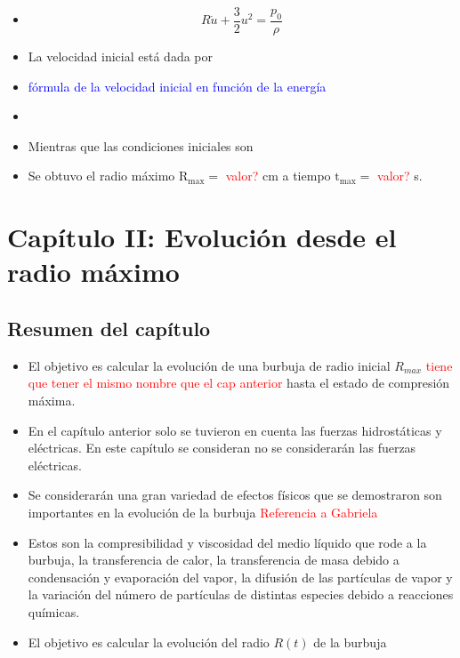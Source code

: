 \documentclass[aps,prb,twocolumn,superscriptaddress,floatfix,longbibliography,10pt]{revtex4-2}
\newif\ifptitle
\newif\ifpnumber
\newcounter{para}
\newcommand\ptitle[1]{\par\refstepcounter{para}
{\ifpnumber{\noindent\textcolor{lightgray}{\textbf{\thepara}}\indent}\fi}
{\ifptitle{\textbf{[{#1}]}}\fi}}
\begin{document}
\begin{itemize}
  \item 
  \begin{equation}
    R \dot{u} + \frac{3}{2}u^2 = \frac{p_0}{\rho}
  \end{equation}


  \item La velocidad inicial está dada por 
  \item \textcolor{blue}{fórmula de la velocidad inicial en función de la energía}
  \item 
  \item Mientras que las condiciones iniciales son 
  \item Se obtuvo el radio máximo $\mathrm{R_{max}} = $ \textcolor{red}{valor?} cm a tiempo $\mathrm{t_{max}} = $ \textcolor{red}{valor?} s.
\end{itemize}






























\section*{Capítulo II: Evolución desde el radio máximo}

\subsection{Resumen del capítulo}

\ptitle{Descripción general de los fenómenos}
\begin{itemize}
  \item El objetivo es calcular la evolución de una burbuja de radio inicial $R_{max}$ \textcolor{red}{tiene que tener el mismo nombre que el cap anterior} hasta el estado de compresión máxima.
  \item En el capítulo anterior solo se tuvieron en cuenta las fuerzas hidrostáticas y eléctricas. En este capítulo se consideran no se considerarán las fuerzas eléctricas.
  \item Se considerarán una gran variedad de efectos físicos que se demostraron son importantes en la evolución de la burbuja \textcolor{red}{Referencia a Gabriela}
  \item Estos son la compresibilidad y viscosidad del medio líquido que rode a la burbuja, la transferencia de calor, la transferencia de masa debido a condensación y evaporación del vapor, la difusión de las partículas de vapor y la variación del número de partículas de distintas especies debido a reacciones químicas.
  \item El objetivo es calcular la evolución del radio $R(t)$ de la burbuja
\end{itemize}
\end{document}
